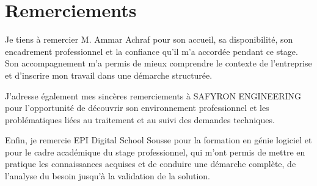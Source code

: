 \chapter*{Remerciements}

\vspace*{0.10\textheight}
\begin{center}
\begin{minipage}{0.82\textwidth}
\itshape
\setlength{\parskip}{1.15em}
\setlength{\emergencystretch}{2em}

Je tiens à remercier M. Ammar Achraf pour son accueil, sa disponibilité, son encadrement professionnel et la confiance qu'il m'a accordée pendant ce stage. Son accompagnement m'a permis de mieux comprendre le contexte de l'entreprise et d'inscrire mon travail dans une démarche structurée.

J'adresse également mes sincères remerciements à SAFYRON ENGINEERING pour l'opportunité de découvrir son environnement professionnel et les problématiques liées au traitement et au suivi des demandes techniques.

Enfin, je remercie EPI Digital School Sousse pour la formation en génie logiciel et pour le cadre académique du stage professionnel, qui m'ont permis de mettre en pratique les connaissances acquises et de conduire une démarche complète, de l'analyse du besoin jusqu'à la validation de la solution.
\end{minipage}
\end{center}
